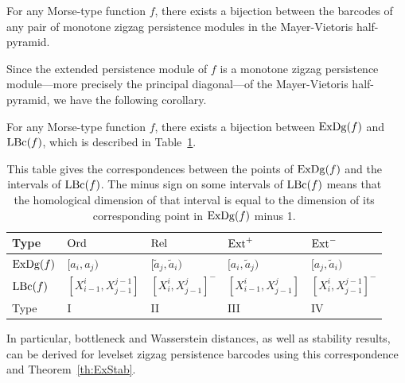\begin{thm}\label{th:MY}
For any Morse-type function $f$, there exists a bijection between the barcodes of any pair of monotone zigzag persistence modules in the Mayer-Vietoris half-pyramid.
\end{thm}

Since the extended persistence module of $f$ is a monotone zigzag persistence
module---more precisely the principal diagonal---of the Mayer-Vietoris half-pyramid, we have the following corollary.


\begin{cor}\label{cor:EPZZ}
For any Morse-type function $f$, there exists a bijection between $\mathrm{ExDg}(f)$ and $\mathrm{LBc}(f)$,
which is described in Table~\ref{tab:EPZZ}.
\end{cor}

\begin{table}[h]\centering
\begin{tabular}{|l|l|l|l|l|}
\hline
Type                      & $\mathrm{Ord}$                         & $\mathrm{Rel}$                      & $\mathrm{Ext}^+$                          & $\mathrm{Ext}^-$                   \\
\hline
$\mathrm{ExDg}(f)$                  & $[a_i,a_j)$                    & $[\tilde a_j, \tilde a_i)$  & $[a_i,\tilde a_j)$                & $[a_j, \tilde a_i)$     \\
\hline
\hline
$\mathrm{LBc}(f)$                & $[X_{i-1}^i,X_{j-1}^{j-1}]$    & $[X_i^i,X_{j-1}^j]^-$       & $[X_{i-1}^i,X_{j-1}^j]$           & $[X_i^i,X_{j-1}^{j-1}]^-$ \\
\hline
Type                      & I                              & II                          & III                               & IV \\
\hline
\end{tabular}
\caption{\label{tab:EPZZ} This table gives the correspondences between the points of $\mathrm{ExDg}(f)$ and the intervals of $\mathrm{LBc}(f)$.
The minus sign on some intervals of $\mathrm{LBc}(f)$ means that the homological dimension of that interval is equal to the dimension of 
its corresponding point in $\mathrm{ExDg}(f)$ minus 1. }
\end{table}
 
In particular, bottleneck and Wasserstein distances, as well as stability results, can be derived for levelset zigzag persistence barcodes using
this correspondence and Theorem~\ref{th:ExStab}.


